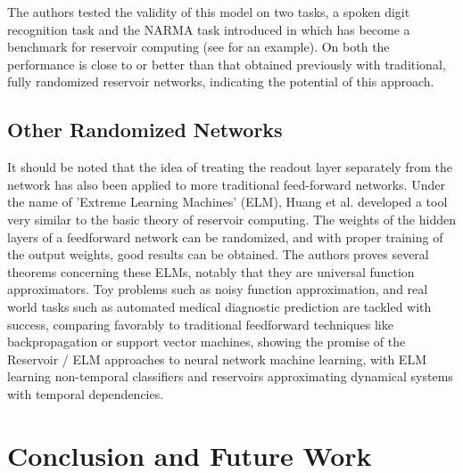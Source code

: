 \documentclass[12pt,oneside]{CUNY_CS_PhD}
\begin{document}
The authors tested the validity of this model on two tasks, a spoken digit recognition task and the NARMA task introduced in \cite{atiya2000new} which has become a benchmark for reservoir computing (see \cite{lukosevicius_survey:_2009} for an example). On both the performance is close to or better than that obtained previously with traditional, fully randomized reservoir networks, indicating the potential of this approach.

\section{Other Randomized Networks}
It should be noted that the idea of treating the readout layer separately from the network has also been applied to more traditional feed-forward networks. Under the name of 'Extreme Learning Machines' (ELM), Huang et al. \cite{huang_extreme_2006,huang_extreme_2011} developed a tool very similar to the basic theory of reservoir computing. The weights of the hidden layers of a feedforward network can be randomized, and with proper training of the output weights, good results can be obtained. The authors proves several theorems concerning these ELMs, notably that they are universal function approximators. Toy problems such as noisy function approximation, and real world tasks such as automated medical diagnostic prediction are tackled with success, comparing favorably to traditional feedforward techniques like backpropagation or support vector machines, showing the promise of the Reservoir / ELM approaches to neural network machine learning, with ELM learning non-temporal classifiers and reservoirs approximating dynamical systems with temporal dependencies.

\chapter{Conclusion and Future Work} 
\end{document}
